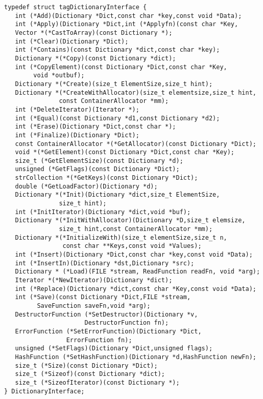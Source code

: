 \begin{verbatim}
typedef struct tagDictionaryInterface {
   int (*Add)(Dictionary *Dict,const char *key,const void *Data);
   int (*Apply)(Dictionary *Dict,int (*Applyfn)(const char *Key,
   Vector *(*CastToArray)(const Dictionary *);
   int (*Clear)(Dictionary *Dict);
   int (*Contains)(const Dictionary *dict,const char *key);
   Dictionary *(*Copy)(const Dictionary *dict);
   int (*CopyElement)(const Dictionary *Dict,const char *Key,
        void *outbuf);
   Dictionary *(*Create)(size_t ElementSize,size_t hint);
   Dictionary *(*CreateWithAllocator)(size_t elementsize,size_t hint,
               const ContainerAllocator *mm);
   int (*DeleteIterator)(Iterator *);
   int (*Equal)(const Dictionary *d1,const Dictionary *d2);
   int (*Erase)(Dictionary *Dict,const char *);
   int (*Finalize)(Dictionary *Dict);
   const ContainerAllocator *(*GetAllocator)(const Dictionary *Dict);
   void *(*GetElement)(const Dictionary *Dict,const char *Key);
   size_t (*GetElementSize)(const Dictionary *d);
   unsigned (*GetFlags)(const Dictionary *Dict);
   strCollection *(*GetKeys)(const Dictionary *Dict);
   double (*GetLoadFactor)(Dictionary *d);
   Dictionary *(*Init)(Dictionary *dict,size_t ElementSize,
               size_t hint);
   int (*InitIterator)(Dictionary *dict,void *buf);
   Dictionary *(*InitWithAllocator)(Dictionary *D,size_t elemsize,
               size_t hint,const ContainerAllocator *mm);
   Dictionary *(*InitializeWith)(size_t elementSize,size_t n,
                const char **Keys,const void *Values);
   int (*Insert)(Dictionary *Dict,const char *key,const void *Data);
   int (*InsertIn)(Dictionary *dst,Dictionary *src);
   Dictionary * (*Load)(FILE *stream, ReadFunction readFn, void *arg);
   Iterator *(*NewIterator)(Dictionary *dict);
   int (*Replace)(Dictionary *dict,const char *Key,const void *Data);
   int (*Save)(const Dictionary *Dict,FILE *stream,
         SaveFunction saveFn,void *arg);
   DestructorFunction (*SetDestructor)(Dictionary *v,
                      DestructorFunction fn);
   ErrorFunction (*SetErrorFunction)(Dictionary *Dict,
                 ErrorFunction fn);
   unsigned (*SetFlags)(Dictionary *Dict,unsigned flags);
   HashFunction (*SetHashFunction)(Dictionary *d,HashFunction newFn);
   size_t (*Size)(const Dictionary *Dict);
   size_t (*Sizeof)(const Dictionary *dict);
   size_t (*SizeofIterator)(const Dictionary *);
} DictionaryInterface;
\end{verbatim}
